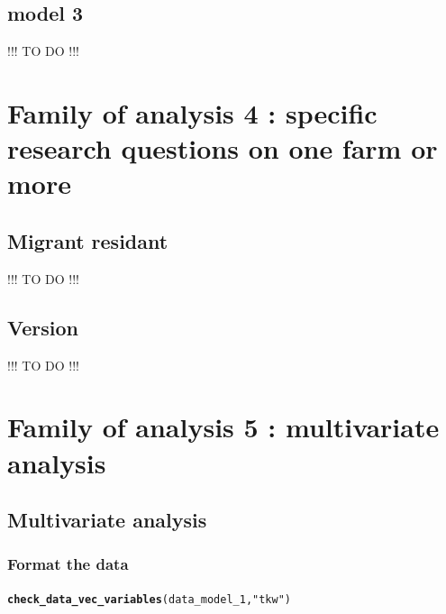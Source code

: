\documentclass{book}\usepackage[]{graphicx}\usepackage[]{color}
\makeatletter
\newcommand{\hlstr}[1]{\textcolor[rgb]{0.192,0.494,0.8}{#1}}%
\newcommand{\hlstd}[1]{\textcolor[rgb]{0.345,0.345,0.345}{#1}}%
\newcommand{\hlkwd}[1]{\textcolor[rgb]{0.737,0.353,0.396}{\textbf{#1}}}%
\newenvironment{kframe}{%
 \def\at@end@of@kframe{}%
 \ifinner\ifhmode%
  \def\at@end@of@kframe{\end{minipage}}%
  \begin{minipage}{\columnwidth}%
 \fi\fi%
 \def\FrameCommand##1{\hskip\@totalleftmargin \hskip-\fboxsep
 \colorbox{shadecolor}{##1}\hskip-\fboxsep
     \hskip-\linewidth \hskip-\@totalleftmargin \hskip\columnwidth}%
 \MakeFramed {\advance\hsize-\width
   \@totalleftmargin\z@ \linewidth\hsize
   \@setminipage}}%
 {\par\unskip\endMakeFramed%
 \at@end@of@kframe}
\newenvironment{knitrout}{}{} %
\makeatother
\begin{document}
\subsection{model 3 }
\label{model_3}

!!! TO DO !!!

\newpage

\section{Family of analysis 4 : specific research questions on one farm or more}
\label{section_analysis4}


\subsection{Migrant residant}
\label{migrant_residant}

!!! TO DO !!!

\newpage


\subsection{Version}
\label{version}


!!! TO DO !!!
\newpage

\section{Family of analysis 5 : multivariate analysis}
\label{section_analysis5}


\subsection{Multivariate analysis}
\label{multivariate_analysis}

\subsubsection{Format the data}

\begin{knitrout}
\color{fgcolor}\begin{kframe}
\begin{alltt}
\hlkwd{check_data_vec_variables}\hlstd{(data_model_1,} \hlstr{"tkw"}\hlstd{)}
\end{alltt}
\end{kframe}
\end{knitrout}
\end{document}
